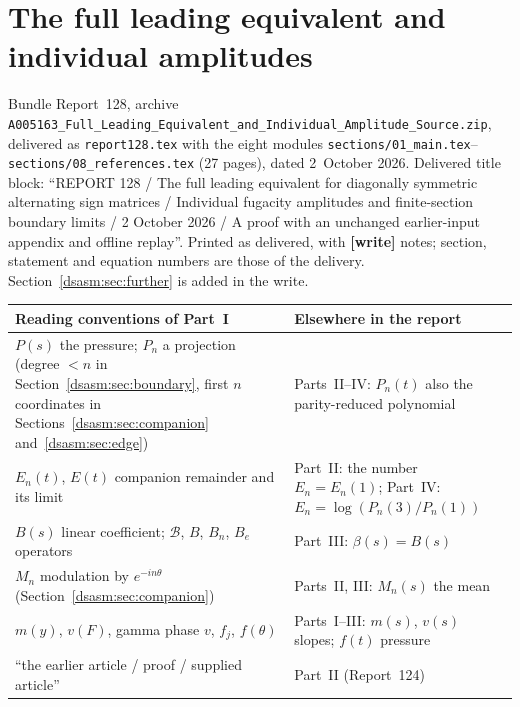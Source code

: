 \documentclass[11pt,letterpaper]{article}
\theoremstyle{remark}\newtheorem{remark}[theorem]{Remark}
\newcommand{\file}[1]{\nolinkurl{#1}}
\newcommand{\partsource}[1]{\par\noindent\begin{minipage}{\textwidth}\small #1\end{minipage}\par\medskip}
\newcommand{\parteqs}[1]{\setcounter{equation}{0}%
 \renewcommand{\theequation}{#1\arabic{equation}}%
 \renewcommand{\theHequation}{#1\arabic{equation}}}
\begin{document}
\part{The full leading equivalent and individual amplitudes}\label{dsasm:part}
\parteqs{}
\partsource{Bundle Report~128, archive \file{A005163_Full_Leading_Equivalent_and_Individual_Amplitude_Source.zip}, delivered as \file{report128.tex} with the eight modules \file{sections/01_main.tex}--\file{sections/08_references.tex} (27 pages), dated 2~October 2026. Delivered title block: ``REPORT 128 / The full leading equivalent for diagonally symmetric alternating sign matrices / Individual fugacity amplitudes and finite-section boundary limits / 2 October 2026 / A proof with an unchanged earlier-input appendix and offline replay''. Printed as delivered, with \textbf{[write]} notes; section, statement and equation numbers are those of the delivery. Section~\ref{dsasm:sec:further} is added in the write.}
\begin{center}
\small
\begin{tabular}{@{}>{\raggedright\arraybackslash}p{} >{\raggedright\arraybackslash}p{}@{}}
\toprule
Reading conventions of Part~I & Elsewhere in the report\\
\midrule
$P(s)$ the pressure; $P_n$ a projection (degree $<n$ in Section~\ref{dsasm:sec:boundary}, first $n$ coordinates in Sections~\ref{dsasm:sec:companion} and~\ref{dsasm:sec:edge}) & Parts~II--IV: $P_n(t)$ also the parity-reduced polynomial\\
$E_n(t)$, $E(t)$ companion remainder and its limit & Part~II: the number $E_n=E_n(1)$; Part~IV: $E_n=\log(P_n(3)/P_n(1))$\\
$B(s)$ linear coefficient; $\mathcal B$, $B$, $B_n$, $B_e$ operators & Part~III: $\beta(s)=B(s)$\\
$M_n$ modulation by $e^{-in\theta}$ (Section~\ref{dsasm:sec:companion}) & Parts~II, III: $M_n(s)$ the mean\\
$m(y)$, $v(F)$, gamma phase $v$, $f_j$, $f(\theta)$ & Parts~I--III: $m(s)$, $v(s)$ slopes; $f(t)$ pressure\\
``the earlier article / proof / supplied article'' & Part~II (Report~124)\\
\bottomrule
\end{tabular}
\end{center}
\end{document}
